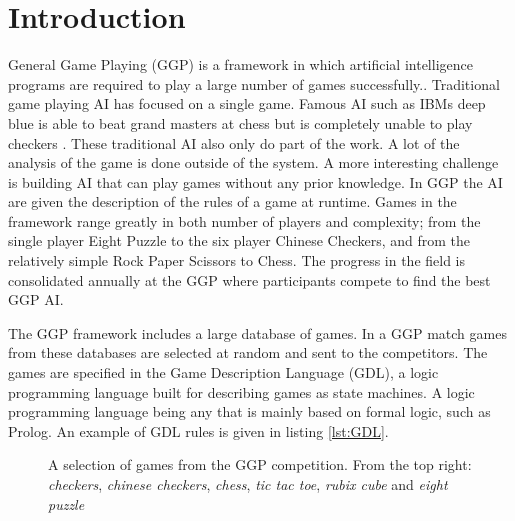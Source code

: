 
\chapter{Introduction}
General Game Playing (GGP) is a framework in which artificial intelligence programs are required to play a large number of games successfully.\cite{Genesereth/GGPOverview}. Traditional game playing AI has focused on a single game. Famous AI such as IBMs deep blue is able to beat grand masters at chess but is completely unable to play checkers \cite{DeepBlue}. These traditional AI also only do part of the work. A lot of the analysis of the game is done outside of the system. A more interesting challenge is building AI that can play games without any prior knowledge. In GGP the AI are given the description of the rules of a game at runtime. Games in the framework range greatly in both number of players and complexity; from the single player Eight Puzzle to the six player Chinese Checkers, and from the relatively simple Rock Paper Scissors to Chess\cite{GGP-Website}. The progress in the field is consolidated annually at the GGP where participants compete to find the best GGP AI.

The GGP framework includes a large database of games. In a GGP match games from these databases are selected at random and sent to the competitors. The games are specified in the Game Description Language (GDL), a logic programming language built for describing games as state machines\cite{GDL_Spec}. A logic programming language being any that is mainly based on formal logic, such as Prolog. An example of GDL rules is given in listing \ref{lst:GDL}.


\begin{figure}[ht]
	\centering
	\caption{A selection of games from the GGP competition. From the top right: \textit{checkers}, \textit{chinese checkers}, \textit{chess}, \textit{tic tac toe}, \textit{rubix cube} and \textit{eight puzzle}}
\end{figure}



